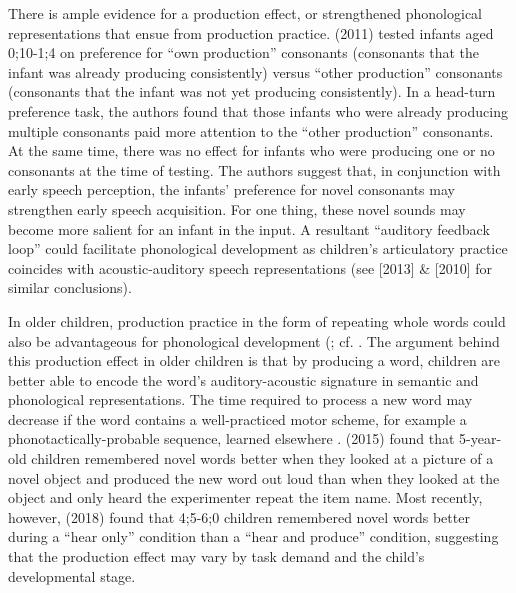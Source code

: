 \documentclass[a4paper,man,natbib,donotrepeattitle, apacite]{apa6}
\begin{document}
There is ample evidence for a production effect, or strengthened phonological representations that ensue from production practice. \citeauthor{depaolisProductionPatternsInfluence2011} (2011) tested infants aged 0;10-1;4 on preference for ``own production'' consonants (consonants that the infant was already producing consistently) versus ``other production'' consonants (consonants that the infant was not yet producing consistently). In a head-turn preference task, the authors found that those infants who were already producing multiple consonants paid more attention to the ``other production'' consonants. At the same time, there was no effect for infants who were producing one or no consonants at the time of testing. The authors suggest that, in conjunction with early speech perception, the infants’ preference for novel consonants may strengthen early speech acquisition. For one thing, these novel sounds may become more salient for an infant in the input. A resultant ``auditory feedback loop'' \cite{majoranoRelationshipInfantsProduction2014} could facilitate phonological development as children’s articulatory practice coincides with acoustic-auditory speech representations (see \citeauthor{depaolisInfluenceBabblingPatterns2013} [2013] \& \citeauthor{keren-portnoyRoleVocalPractice2010} [2010] for similar conclusions). 

In older children, production practice in the form of repeating whole words could also be advantageous for phonological development (; cf. . The argument behind this production effect in older children is that by producing a word, children are better able to encode the word’s auditory-acoustic signature in semantic and phonological representations. The time required to process a new word may decrease if the word contains a well-practiced motor scheme, for example a phonotactically-probable sequence, learned elsewhere \cite{storkelComparisonHomonymNovel2005,storkelInfluencePartwordPhonotactic2011}. \citeauthor{ichtProductionEffectMemory2015} (2015) found that 5-year-old children remembered novel words better when they looked at a picture of a novel object and produced the new word out loud than when they looked at the object and only heard the experimenter repeat the item name. Most recently, however, \citeauthor{zamunerReverseProductionEffect2018} (2018) found that 4;5-6;0 children remembered novel words better during a ``hear only'' condition than a ``hear and produce'' condition, suggesting that the production effect may vary by task demand and the child’s developmental stage. 
\end{document}
